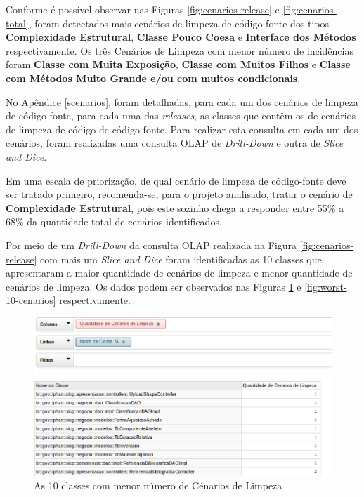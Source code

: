 Conforme é possível observar nas Figuras \ref{fig:cenarios-release} e \ref{fig:cenarios-total}, foram detectados mais cenários de limpeza de código-fonte dos tipos \textbf{Complexidade Estrutural}, \textbf{Classe Pouco Coesa} e \textbf{Interface dos Métodos} respectivamente. Os três Cenários de Limpeza com menor número de incidências foram \textbf{Classe com Muita Exposição}, \textbf{Classe com Muitos Filhos} e \textbf{Classe com Métodos Muito Grande e/ou com muitos condicionais}.

No Apêndice \ref{scenarios}, foram detalhadas, para cada um dos cenários de limpeza de código-fonte, para cada uma das \textit{releases}, as classes que contêm os de cenários de limpeza de código de código-fonte. Para realizar esta consulta em cada um dos cenários, foram realizadas uma consulta OLAP de \textit{Drill-Down} e outra de \textit{Slice and Dice}.

Em uma escala de priorização, de qual cenário de limpeza de código-fonte deve ser tratado primeiro, recomenda-se, para o projeto analisado, tratar o cenário de \textbf{Complexidade Estrutural}, pois este sozinho chega a responder entre 55\% a 68\% da quantidade total de cenários identificados. 

Por meio de um \textit{Drill-Down} da consulta OLAP realizada na Figura \ref{fig:cenarios-release} com mais um \textit{Slice and Dice} foram identificadas as 10 classes que apresentaram a maior quantidade de cenários de limpeza e menor quantidade de cenários de limpeza. Os dados podem ser observados nas Figuras \ref{fig:best-10-cenarios} e \ref{fig:worst-10-cenarios} respectivamente.

\begin{figure}[ht!]
\centering
\includegraphics[keepaspectratio=true,scale=0.6]{figuras/10-worst.eps}
\caption{As 10 classes com menor número de Cénarios de Limpeza}
\label{fig:best-10-cenarios}
\end{figure}
\FloatBarrier


